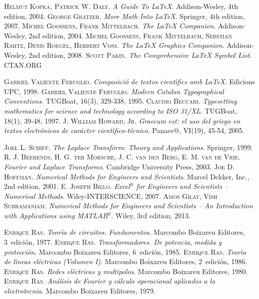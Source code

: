 \begin{thebibliography}{99}


     \textsc{Helmut Kopka, Patrick W. Daly}. \textsl{A Guide To \LaTeX}.  Addison-Wesley, 4th edition, 2004.
     \textsc{George Gr\"{a}tzer}. \textsl{More Math Into \LaTeX}.  Springer, 4th edition, 2007.
     \textsc{Michel Goossens, Frank Mittelbach}. \textsl{The \LaTeX{} Companion}.  Addison-Wesley, 2nd edition, 2004.
     \textsc{Michel Goossens, Frank Mittelbach, Sebstian Rahtz, Denis Roegel, Herbert Vo{\ss}}. \textsl{The \LaTeX{} Graphics Companion}.  Addison-Wesley, 2nd edition, 2008.
     \textsc{Scott Pakin}. \textsl{The Comprehensive \LaTeX{} Symbol List}. CTAN.ORG

     \textsc{Gabriel Valiente Feruglio}. \textsl{Composici\'{o} de textos cient\'{\i}fics amb \LaTeX}.  Edicions UPC, 1998.
     \textsc{Gabriel Valiente Feruglio}. \textsl{Modern Catalan Typographical Conventions}.  TUGBoat, 16(3), 329-338, 1995.
     \textsc{Claudio Beccari}. \textsl{Typesetting mathematics for science and technology according to ISO 31/XL}.  TUGBoat, 18(1), 39-48, 1997.
     \textsc{J. William Howard, Jr}. \textsl{Graecum est: el uso del griego en textos electr\'{o}nicos de car\'{a}cter cient\'{\i}fico-t\'{e}cnico}.  Panace@, VI(19), 45-54, 2005.


     \textsc{Joel L. Schiff}. \textsl{The Laplace Transform: Theory and Applications}.  Springer, 1999.
     \textsc{R. J. Beerends, H. G. ter Morsche, J. C. van den Berg, E. M. van de Vrie}. \textsl{Fourier and Laplace Transforms}.  Cambridge University Press, 2003.
     \textsc{Joe D. Hoffman}. \textsl{Numerical Methods for Engineers and Scientists}.  Marcel Dekker, Inc., 2nd edition, 2001.
     \textsc{E. Joseph Billo}. \textsl{Excel${}^\circledR$ for Engineers and Scientists -- Numerical Methods}.  Wiley-INTERSCIENCE, 2007.
     \textsc{Amos Gilat, Vish Subramaniam}. \textsl{Numerical Methods for Engineers and Scientists --
        An Introduction with Applications using MATLAB${}^\circledR$}.  Wiley, 3rd edition, 2013.
         

     \textsc{Enrique Ras}. \textsl{Teor\'{\i}a de circuitos. Fundamentos}.  Marcombo Boixareu Editores, 3\textordfeminine\ edici\'{o}n, 1977.
     \textsc{Enrique Ras}. \textsl{Transformadores. De potencia, medida y protecci\'{o}n}.  Marcombo Boixareu Editores, 6\textordfeminine\ edici\'{o}n, 1985.
     \textsc{Enrique Ras}. \textsl{Teor\'{\i}a de l\'{\i}neas el\'{e}ctricas (Volumen I)}.  Marcombo Boixareu Editores, 2\textordfeminine\ edici\'{o}n, 1986.
     \textsc{Enrique Ras}. \textsl{Redes el\'{e}ctricas y multipolos}.  Marcombo Boixareu Editores, 1980.
     \textsc{Enrique Ras}. \textsl{An\'{a}lisis de Fourier y c\'{a}lculo operacional aplicados a la electrotecnia}.  Marcombo Boixareu Editores, 1979.


\end{thebibliography}
